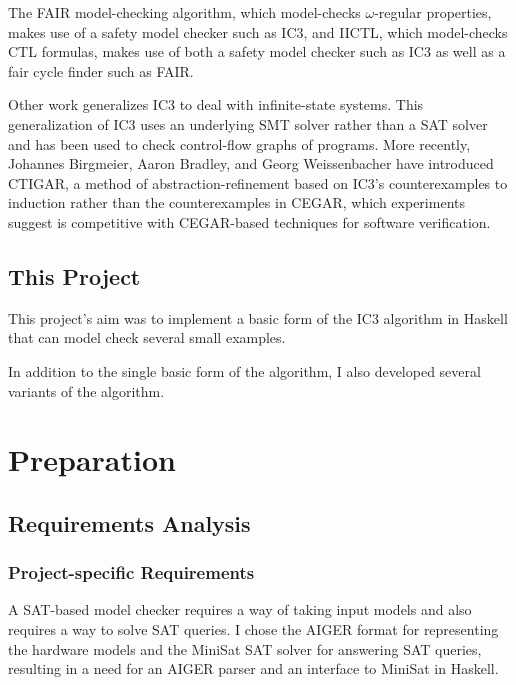 \documentclass[12pt,a4paper,twoside,openright]{report}
\begin{document}
The FAIR model-checking algorithm, which model-checks $\omega$-regular properties,
makes use of a safety model checker such as IC3, and IICTL, which model-checks
CTL formulas, makes use of both a safety model checker such as IC3 as well as a fair cycle
finder such as FAIR.

Other work generalizes IC3 to deal with infinite-state systems. This generalization of IC3
uses an underlying SMT solver rather than a SAT solver and has been used to check
control-flow graphs of programs. More recently, Johannes Birgmeier, Aaron Bradley,
and Georg Weissenbacher have introduced CTIGAR, a method of abstraction-refinement
based on IC3's counterexamples to induction rather than the counterexamples in CEGAR,
which experiments suggest is competitive with CEGAR-based techniques for software
verification.

\section{This Project}

This project's aim was to implement a basic form of the IC3 algorithm in Haskell that can
model check several small examples.

In addition to the single basic form of the algorithm, I also developed several
variants of the algorithm.

\chapter{Preparation}

\section{Requirements Analysis}

\subsection{Project-specific Requirements}

A SAT-based model checker requires a way of taking input models and also requires a
way to solve SAT queries. I chose the AIGER format for representing the hardware models
and the MiniSat SAT solver for answering SAT queries, resulting in a need for an AIGER
parser and an interface to MiniSat in Haskell.
\end{document}
